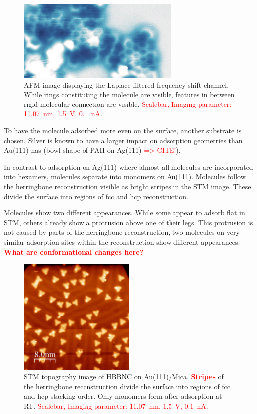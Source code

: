 \begin{figure}[] \centering
	\includegraphics[width=0.7\textwidth]{./images/hbbnc-annealed-afm}
	\caption{AFM image displaying the Laplace filtered frequency shift channel. While rings constituting the molecule are visible, features in between rigid molecular connection are visible. \textcolor{red}{Scalebar, Imaging parameter: \SI{11.07}{\nano \meter}, \SI{1.5}{\volt}, \SI{0.1}{\nano \ampere}}.}
	\label{}
\end{figure}

To have the molecule adsorbed more even on the surface, another substrate is chosen. Silver is known to have a larger impact on adsorption geometries than Au(111) has (bowl shape of PAH on Ag(111) \textcolor{red}{=> CITE!}).

In contrast to adsorption on Ag(111) where almost all molecules are incorporated into hexamers, molecules separate into monomers on Au(111). Molecules follow the herringbone reconstruction visible as bright stripes in the STM image. These divide the surface into regions of fcc and hcp reconstruction.

Molecules show two different appearances. While some appear to adsorb flat in STM, others already show a protrusion above one of their legs. This protrusion is not caused by parts of the herringbone reconstruction, two molecules on very similar adsorption sites within the reconstruction show different appearances.
\textcolor{red}{\textbf{What are conformational changes here?}}

\begin{figure}[] \centering
	\includegraphics[width=0.5\textwidth]{./images/hbbnc-au-111-rt}
	\caption{STM topography image of HBBNC on Au(111)/Mica. \textcolor{red}{\textbf{Stripes}} of the herringbone reconstruction divide the surface into regions of fcc and hcp stacking order. Only monomers form after adsorption at RT. \textcolor{red}{Scalebar, Imaging parameter: \SI{11.07}{\nano \meter}, \SI{1.5}{\volt}, \SI{0.1}{\nano \ampere}}.}
	\label{}
\end{figure}

